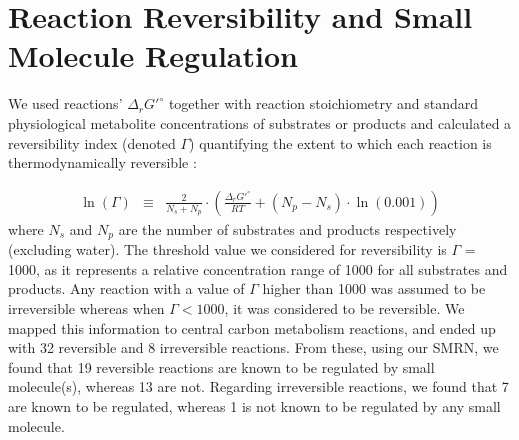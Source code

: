 \documentclass[12pt,a4paper]{article}
\begin{document}
\section{Reaction Reversibility and Small Molecule Regulation}

We used reactions’ $\Delta_r G'^\circ$ together with reaction stoichiometry and standard physiological metabolite concentrations of substrates or products and calculated a reversibility index (denoted $\Gamma$) quantifying the extent to which each reaction is thermodynamically reversible \cite{Noor2012-mp}:

\begin{eqnarray}
	\ln(\Gamma) &\equiv& \frac{2}{N_s+N_p} \cdot \left( \frac{\Delta_r G'^\circ}{RT} + (N_p - N_s)\cdot \ln (0.001) \right)
\end{eqnarray}
where $N_s$ and $N_p$ are the number of substrates and products respectively (excluding water).
The threshold value we considered for reversibility is $\Gamma$ = 1000, as it represents a relative concentration range of 1000 for all substrates and products. Any reaction with a value of $\Gamma$ higher than 1000 was assumed to be irreversible whereas when $\Gamma < 1000$, it was considered to be reversible. We mapped this information to central carbon metabolism reactions, and ended up with 32 reversible and 8 irreversible reactions. From these, using our SMRN, we found that 19 reversible reactions are known to be regulated by small molecule(s), whereas 13 are not. Regarding irreversible reactions, we found that 7 are known to be regulated, whereas 1 is not known to be regulated by any small molecule. 
\end{document}
